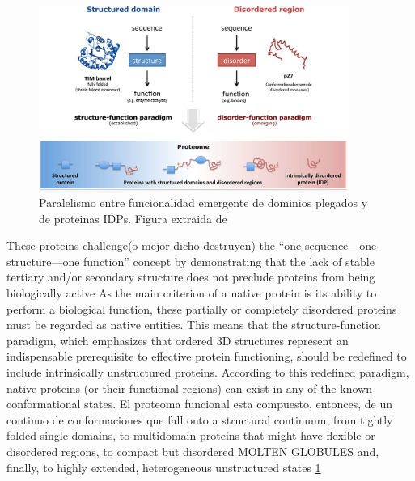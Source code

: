 \begin{figure}[h!,centered]
\centering
\includegraphics[width=0.9\textwidth]{img/structure-idp-function.jpeg} 
\caption{Paralelismo entre funcionalidad emergente de dominios plegados y de proteinas IDPs. Figura extraida de \cite{van2014classification}}
\label{stuctured-idp-functions}
\end{figure}


These proteins challenge(o mejor dicho destruyen) the “one sequence—one structure—one function” concept by demonstrating that the lack of stable tertiary and/or secondary structure does not preclude proteins from being biologically active
As the main criterion of a native protein is its ability to perform a biological function, these partially or completely disordered proteins must be regarded as native entities.
This means that the structure-function paradigm, which emphasizes that ordered 3D structures represent an indispensable prerequisite to effective protein functioning, should be redefined to include intrinsically unstructured proteins. 
According to this redefined paradigm,  native proteins (or their functional regions) can exist in any of the known conformational states.
El proteoma funcional esta compuesto, entonces, de un continuo de conformaciones que fall onto a structural continuum, from tightly folded single domains, to multidomain proteins that might have flexible or disordered regions, 
to compact but disordered MOLTEN GLOBULES and, finally, to highly extended, heterogeneous unstructured states \ref{stuctured-idp-functions}




